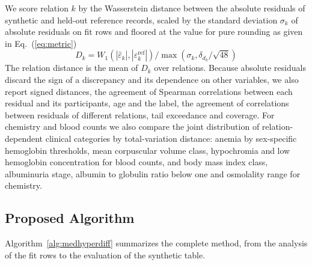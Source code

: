 \documentclass[conference]{IEEEtran}
\begin{document}
We score relation $k$ by the Wasserstein distance between the absolute residuals of synthetic and held-out reference records, scaled by the standard deviation $\sigma_k$ of absolute residuals on fit rows and floored at the value for pure rounding as given in Eq.~(\ref{eq:metric})
\begin{equation}
D_k = W_1\!\left(|\hat{\varepsilon}_k|, |\varepsilon_k^{\mathrm{ref}}|\right) / \max\!\left(\sigma_k, \delta_{d_k}/\sqrt{48}\right)
\label{eq:metric}
\end{equation}
The relation distance is the mean of $D_k$ over relations. Because absolute residuals discard the sign of a discrepancy and its dependence on other variables, we also report signed distances, the agreement of Spearman correlations between each residual and its participants, age and the label, the agreement of correlations between residuals of different relations, tail exceedance and coverage. For chemistry and blood counts we also compare the joint distribution of relation-dependent clinical categories by total-variation distance: anemia by sex-specific hemoglobin thresholds, mean corpuscular volume class, hypochromia and low hemoglobin concentration for blood counts, and body mass index class, albuminuria stage, albumin to globulin ratio below one and osmolality range for chemistry.

\subsection{Proposed Algorithm}

Algorithm~\ref{alg:medhyperdiff} summarizes the complete method, from the analysis of the fit rows to the evaluation of the synthetic table.
\end{document}
